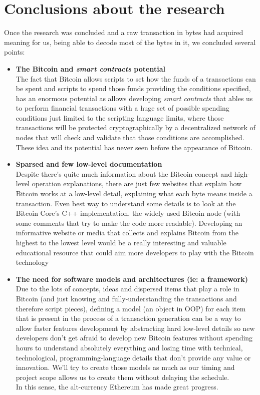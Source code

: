 \section{Conclusions about the research}
Once the research was concluded and a raw transaction in bytes had acquired meaning for us, being able to decode most of the bytes in it, we concluded several points:
\begin{itemize}
    \item \textbf{The Bitcoin and \textit{smart contracts} potential}\\
    The fact that Bitcoin allows scripts to set how the funds of a transactions can be spent and scripts to spend those funds providing the conditions specified, has an enormous potential as allows developing \textit{smart contracts} that ables us to perform financial transactions with a huge set of possible spending conditions just limited to the scripting language limits, where those transactions will be protected cryptographically by a decentralized network of nodes that will check and validate that those conditions are accomplished. These idea and its potential has never seen before the appearance of Bitcoin.
    \item \textbf{Sparsed and few low-level documentation}\\ Despite there's quite much information about the Bitcoin concept and high-level operation explanations, there are just few websites that explain how Bitcoin works at a low-level detail, explaining what each byte means inside a transaction. Even best way to understand some details is to look at the Bitcoin Core's C++ implementation\cite{bitcoin_github:online}, the widely used Bitcoin node (with some comments that try to make the code more readable). Developing an informative website or media that collects and explains Bitcoin from the highest to the lowest level would be a really interesting and valuable educational resource that could aim more developers to play with the Bitcoin technology
    \item \textbf{The need for software models and architectures (ie: a framework)}\\ Due to the lots of concepts, ideas and dispersed items that play a role in Bitcoin (and just knowing and fully-understanding the transactions and therefore script pieces), defining a model (an object in OOP) for each item that is present in the process of a transaction generation can be a way to allow faster features development by abstracting hard low-level details so new developers don't get afraid to develop new Bitcoin features without spending hours to understand absolutely everything and losing time with technical, technological, programming-language details that don't provide any value or innovation. We'll try to create those models as much as our timing and project scope allows us to create them without delaying the schedule.\\ In this sense, the alt-currency Ethereum\cite{ethereum:online} has made great progress.
\end{itemize}